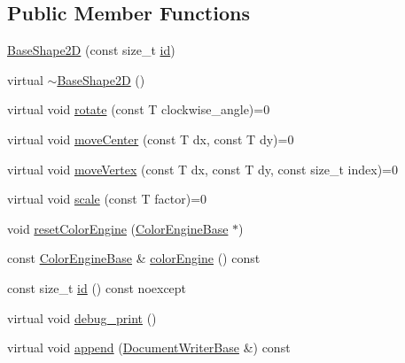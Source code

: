 \subsection*{Public Member Functions}
\begin{DoxyCompactItemize}
\item 
\hyperlink{classGraphicalEditorCore_1_1BaseShape2D_a5d316bdae47e5b53ea6737f918a1340a}{Base\+Shape2D} (const size\+\_\+t \hyperlink{classGraphicalEditorCore_1_1BaseShape2D_ac66cfa23289ae36d70ff6b7c41dd791f}{id})
\item 
virtual \hyperlink{classGraphicalEditorCore_1_1BaseShape2D_ac3cf9262d27b9b1b84afc8ddb729f743}{$\sim$\+Base\+Shape2D} ()
\item 
virtual void \hyperlink{classGraphicalEditorCore_1_1BaseShape2D_a94a87b2fd8485cfb7d4ca97050d1bdde}{rotate} (const T clockwise\+\_\+angle)=0
\item 
virtual void \hyperlink{classGraphicalEditorCore_1_1BaseShape2D_adebef5c637da2c34a2fe728022740f94}{move\+Center} (const T dx, const T dy)=0
\item 
virtual void \hyperlink{classGraphicalEditorCore_1_1BaseShape2D_a9e6394ecf62e475a1d087e89258d4131}{move\+Vertex} (const T dx, const T dy, const size\+\_\+t index)=0
\item 
virtual void \hyperlink{classGraphicalEditorCore_1_1BaseShape2D_a2ff960ec57b180222a084642fa7dc780}{scale} (const T factor)=0
\item 
void \hyperlink{classGraphicalEditorCore_1_1BaseShape2D_abd6e21c5c3911a2926b210dd69584571}{reset\+Color\+Engine} (\hyperlink{classGraphicalEditorCore_1_1ColorEngineBase}{Color\+Engine\+Base} $\ast$)
\item 
const \hyperlink{classGraphicalEditorCore_1_1ColorEngineBase}{Color\+Engine\+Base} \& \hyperlink{classGraphicalEditorCore_1_1BaseShape2D_aed3e9da5f221282c0b7f958ad7c834c5}{color\+Engine} () const 
\item 
const size\+\_\+t \hyperlink{classGraphicalEditorCore_1_1BaseShape2D_ac66cfa23289ae36d70ff6b7c41dd791f}{id} () const noexcept
\item 
virtual void \hyperlink{classGraphicalEditorCore_1_1BaseShape2D_ab1db8da4296c0499c0e3bba4601bcc97}{debug\+\_\+print} ()
\item 
virtual void \hyperlink{classGraphicalEditorCore_1_1BaseShape2D_ac8f67c255fe72fd97aa7a5df80b698be}{append} (\hyperlink{classGraphicalEditorCore_1_1DocumentWriterBase}{Document\+Writer\+Base} \&) const 
\end{DoxyCompactItemize}


